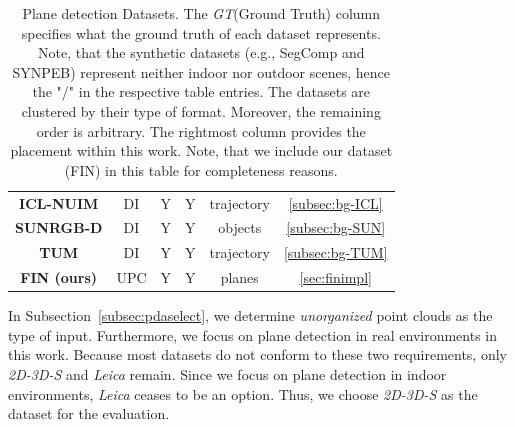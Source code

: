 \documentclass[main.tex]{subfiles}
\begin{document}
\begin{table}[H]
\begin{tabular}{c|c|c|c|c|c}
        \textbf{ICL-NUIM}    \cite{handa:etal:ICRA2014}                                                                                                                                       & DI                    & Y             & Y               & trajectory  & \ref{subsec:bg-ICL}      \\
        \textbf{SUNRGB-D}         \cite{7298655}                                                                                                                                              & DI                    & Y             & Y               & objects     & \ref{subsec:bg-SUN}      \\
        \textbf{TUM}         \cite{sturm12iros}                                                                                                                                               & DI                    & Y             & Y               & trajectory  & \ref{subsec:bg-TUM}      \\ \hline
        \textbf{FIN (ours)}                                                                                                                                                                   & UPC                   & Y             & Y               & planes      & \ref{sec:finimpl}
    \end{tabular}
    \caption[Popular Datasets]{Plane detection Datasets. The \textit{GT}(Ground Truth) column specifies what the ground truth of each dataset represents.
        Note, that the synthetic datasets (e.g., SegComp and SYNPEB) represent neither indoor nor outdoor scenes, hence the "/" in
        the respective table entries. The datasets are clustered by their type of format. Moreover, the remaining order is arbitrary.
        The rightmost column provides the placement within this work.
        Note, that we include our dataset (FIN) in this table for completeness reasons.
    }
    \label{tab:datasets}
\end{table}
In Subsection~\ref{subsec:pdaselect}, we determine \textit{unorganized} point clouds as the type of input. Furthermore, we focus on plane detection in real environments in this work.
Because most datasets do not conform to these two requirements, only \textit{2D-3D-S} and \textit{Leica} remain.
Since we focus on plane detection in indoor environments, \textit{Leica} ceases to be an option.
Thus, we choose \textit{2D-3D-S} as the dataset for the evaluation.
\end{document}

